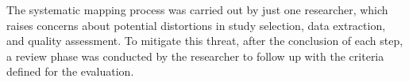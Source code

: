 \documentclass[sigconf,nonacm]{acmart}
\begin{document}
The systematic mapping process was carried out by just one researcher, which raises concerns about potential distortions in study selection, data extraction, and quality assessment. To mitigate this threat, after the conclusion of each step, a review phase was conducted by the researcher to follow up with the criteria defined for the evaluation.



\end{document}
